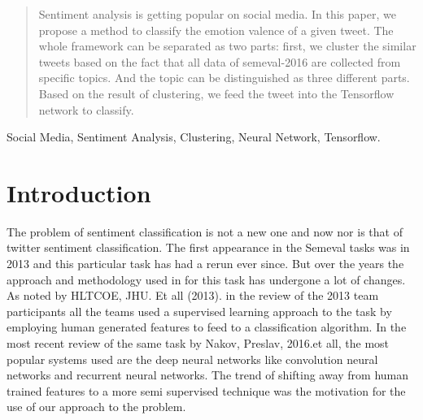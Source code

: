 \documentclass[conference]{IEEEtran}
\begin{document}
\begin{abstract}
Sentiment analysis is getting popular on social media. In this paper, we propose a method to classify the emotion valence of a given tweet. The whole framework can be separated as two parts: first, we cluster the similar tweets based on the fact that all data of semeval-2016 are collected from specific topics. And the topic can be distinguished as three different parts. Based on the result of clustering, we feed the tweet into the Tensorflow network to classify.
\end{abstract}

\begin{IEEEkeywords}
Social Media, Sentiment Analysis, Clustering, Neural Network, Tensorflow.
\end{IEEEkeywords}






%
\IEEEpeerreviewmaketitle

\section{Introduction}
The problem of sentiment classification is not a new one and now nor is that of twitter sentiment classification. The first appearance in the Semeval tasks was in 2013 and this particular task has had a rerun ever since. But over the years the approach and methodology used in for this task has undergone a lot of changes. As noted by HLTCOE, JHU. Et all (2013). in the review of the 2013 team participants all the teams used a supervised learning approach to the task by employing human generated features to feed to a classification algorithm. In the most recent review of the same task by Nakov, Preslav, 2016.et all, the most popular systems used are the deep neural networks like convolution neural networks and recurrent neural networks. The trend of shifting away from human trained features to a more semi supervised technique was the motivation for the use of our approach to the problem. 
\end{document}
